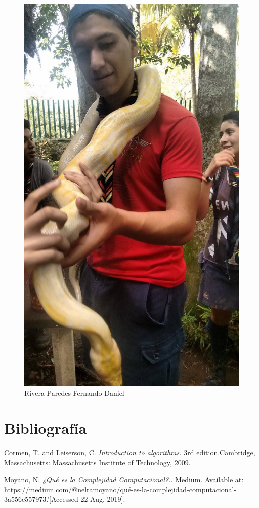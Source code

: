 \documentclass[12pt,twoside]{article}
\begin{document}
\begin{figure}[!h]
\begin{minipage}[t]{10cm}
		\includegraphics[scale=0.2]{Foto2}
		\caption{Rivera Paredes Fernando Daniel}
	\end{minipage}
\end{figure}

\section{Bibliograf\'ia}

\begin{thebibliography}{9}
  Cormen, T. and Leiserson, C.
  \textit{Introduction to algorithms.} 
  3rd edition.Cambridge, Massachusetts: Massachusetts Institute of Technology, 2009.

  Moyano, N.
  \textit{¿Qué es la Complejidad Computacional?.}.
  Medium. Available at: https://medium.com/@nelramoyano/qué-es-la-complejidad-computacional-3a556e557973.'[Accessed 22 Aug. 2019].
\end{thebibliography}
\end{document}
